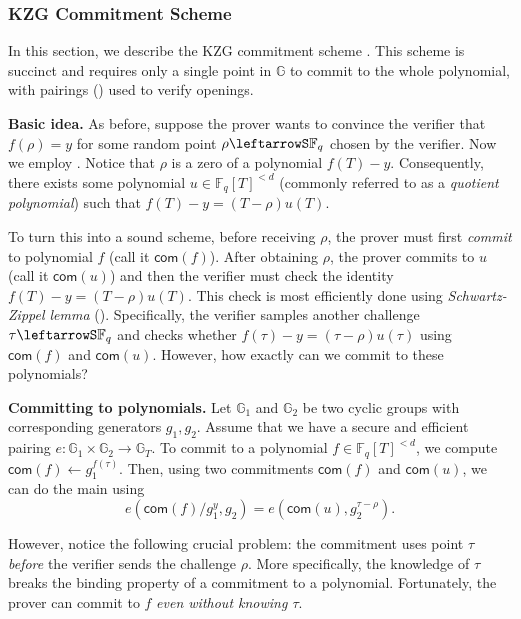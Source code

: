 \documentclass[../../book]{subfiles}
\begin{document}
\subsubsection{KZG Commitment Scheme}

In this section, we describe the KZG commitment scheme \cite{kate2010constant}. This scheme is succinct and requires only a single point in $\mathbb{G}$ to commit to the whole polynomial, with pairings () used to verify openings.

\textbf{Basic idea.} As before, suppose the prover wants to convince the verifier that $f(\rho)=y$ for some random point $\rho \leftarrowS \mathbb{F}_q$ chosen by the verifier.
Now we employ . Notice that $\rho$ is a zero of a polynomial $f(T)-y$. 
Consequently, there exists some polynomial $u \in \mathbb{F}_q[T]^{<d}$ (commonly referred to as a \emph{quotient polynomial}) such that $f(T)-y = (T-\rho)u(T)$.

To turn this into a sound scheme, before receiving $\rho$, the prover must first \emph{commit} to polynomial $f$ (call it $\mathsf{com}(f)$).
After obtaining $\rho$, the prover commits to $u$ (call it $\mathsf{com}(u)$) and then the verifier must check the identity $f(T)-y = (T-\rho)u(T)$.
This check is most efficiently done using \textit{Schwartz-Zippel lemma} ().
Specifically, the verifier samples another challenge $\tau \leftarrowS \mathbb{F}_q$ and checks whether $f(\tau)-y=(\tau-\rho)u(\tau)$ using $\mathsf{com}(f)$ and $\mathsf{com}(u)$.
However, how exactly can we commit to these polynomials?

\textbf{Committing to polynomials.} Let $\mathbb{G}_1$ and $\mathbb{G}_2$ be two cyclic groups with corresponding generators $g_1,g_2$.
Assume that we have a secure and efficient pairing $e: \mathbb{G}_1 \times \mathbb{G}_2 \to \mathbb{G}_T$.
To commit to a polynomial $f \in \mathbb{F}_q[T]^{<d}$, we compute $\mathsf{com}(f) \gets g_1^{f(\tau)}$.
Then, using two commitments $\mathsf{com}(f)$ and $\mathsf{com}(u)$, we can do the main using
\begin{equation*}
    e(\mathsf{com}(f)/g_1^y, g_2) = e(\mathsf{com}(u), g_2^{\tau-\rho}).
\end{equation*}

However, notice the following crucial problem: the commitment uses point $\tau$ \emph{before} the verifier sends the challenge $\rho$.
More specifically, the knowledge of $\tau$ breaks the binding property of a commitment to a polynomial.
Fortunately, the prover can commit to $f$ \emph{even without knowing $\tau$}.
\end{document}

